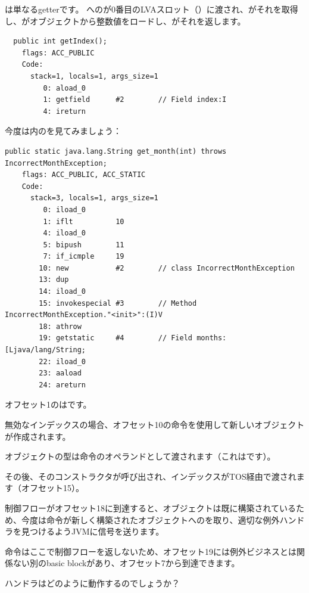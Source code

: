 は単なるgetterです。
へのが0番目の\ac{LVA}スロット（）に渡され、がそれを取得し、がオブジェクトから整数値をロードし、がそれを返します。

\begin{lstlisting}
  public int getIndex();
    flags: ACC_PUBLIC
    Code:
      stack=1, locals=1, args_size=1
         0: aload_0       
         1: getfield      #2        // Field index:I
         4: ireturn       
\end{lstlisting}

今度は内のを見てみましょう：

\begin{lstlisting}[caption=Month2.class]
  public static java.lang.String get_month(int) throws IncorrectMonthException;
    flags: ACC_PUBLIC, ACC_STATIC
    Code:
      stack=3, locals=1, args_size=1
         0: iload_0       
         1: iflt          10
         4: iload_0       
         5: bipush        11
         7: if_icmple     19
        10: new           #2        // class IncorrectMonthException
        13: dup           
        14: iload_0       
        15: invokespecial #3        // Method IncorrectMonthException."<init>":(I)V
        18: athrow        
        19: getstatic     #4        // Field months:[Ljava/lang/String;
        22: iload_0       
        23: aaload        
        24: areturn       
\end{lstlisting}

オフセット1のはです。

無効なインデックスの場合、オフセット10の命令を使用して新しいオブジェクトが作成されます。

オブジェクトの型は命令のオペランドとして渡されます（これはです）。

その後、そのコンストラクタが呼び出され、インデックスが\ac{TOS}経由で渡されます（オフセット15）。

制御フローがオフセット18に到達すると、オブジェクトは既に構築されているため、今度は命令が新しく構築されたオブジェクトへのを取り、適切な例外ハンドラを見つけるよう\ac{JVM}に信号を送ります。

命令はここで制御フローを返しないため、オフセット19には例外ビジネスとは関係ない別の\gls{basic block}があり、オフセット7から到達できます。

ハンドラはどのように動作するのでしょうか？

